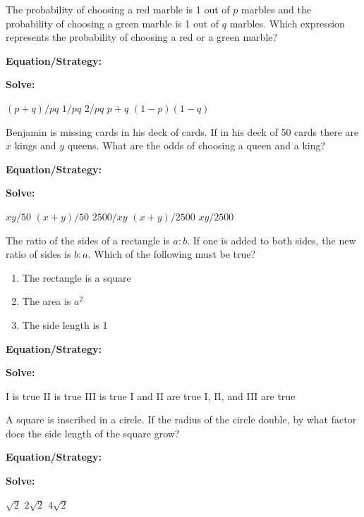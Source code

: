\vfill
\newpage
\begin{multicols*}{2}
\begin{outline}[enumerate]
\medium

\1 The probability of choosing a red marble is 1 out of $p$ marbles and the probability of choosing a green marble is 1 out of $q$ marbles. Which expression represents the probability of choosing a red or a green marble?

\bigskip
\textbf{Equation/Strategy:} \hrulefill

\bigskip
\textbf{Solve:}

\vfill
\2 $(p+q)/pq$
\2 $1/pq$
\2 $2/pq$
\2 $p+q$
\2 $(1-p)(1-q)$

\midline

\1 Benjamin is missing cards in his deck of cards. If in his deck of 50 cards there are $x$ kings and $y$ queens. What are the odds of choosing a queen and a king?

\bigskip
\textbf{Equation/Strategy:} \hrulefill

\bigskip
\textbf{Solve:}

\vfill
\2 $xy/50$
\2 $(x+y)/50$
\2 $2500/xy$
\2 $(x+y)/2500$
\2 $xy/2500$

\columnbreak
\advanced

\1 The ratio of the sides of a rectangle is $a:b$. If one is added to both sides, the new ratio of sides is $b:a$. Which of the following must be true?

\begin{enumerate}[label=\Roman*.]
\item The rectangle is a square
\item The area is $a^2$
\item The side length is 1
\end{enumerate}

\bigskip
\textbf{Equation/Strategy:} \hrulefill

\bigskip
\textbf{Solve:}

\vfill
\2 I is true
\2 II is true
\2 III is true
\2 I and II are true
\2 I, II, and III are true

\midline

\1 A square is inscribed in a circle. If the radius of the circle double, by what factor does the side length of the square grow?

\bigskip
\textbf{Equation/Strategy:} \hrulefill

\bigskip
\textbf{Solve:}

\vfill
{}
\2 $\sqrt2$
\2 $2\sqrt2$
\2 $4\sqrt2$
\end{outline}
\end{multicols*}